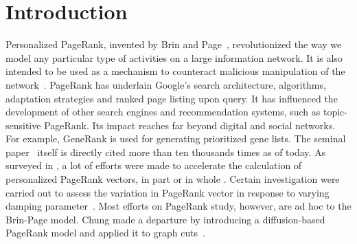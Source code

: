 \documentclass[conference]{IEEEtran}
\begin{document}




\section{Introduction}
\label{sec:intro}
% 


Personalized PageRank, invented by Brin and Page~\cite{page1999pagerank,
  ilprints361}, revolutionized the way we model any particular type of
activities on a large information network. It is also intended to be
used as a mechanism to counteract malicious manipulation of the
network~\cite{page1999pagerank, ilprints361, sheldon2010manipulation}. 
PageRank has underlain Google's
search architecture, algorithms, adaptation strategies and ranked page
listing upon query.  It has influenced the development of other
search engines and recommendation systems, such as topic-sensitive
PageRank\cite{haveliwala2003topic}. Its impact reaches far beyond
digital and social networks. For example, GeneRank is used for
generating prioritized gene
lists\cite{morrison2005generank,wu2010krylov}. The seminal
paper~\cite{page1999pagerank} itself is directly cited more than ten
thousands times as of today.  As surveyed in
\cite{langville2004deeper,berkhin2005survey}, a lot of efforts were made
to accelerate the calculation of personalized PageRank vectors, in part
or in whole \cite{ilprints596,ilprints579}. Certain investigation were
carried out to assess the variation in PageRank vector in response to
varying damping
parameter~\cite{boldi2005pagerank,bressan2010choose}. Most efforts on
PageRank study, however, are ad hoc to the Brin-Page model. Chung made
a departure by introducing a diffusion-based PageRank model and applied
it to graph cuts~\cite{chung2007heat,chung2009local}.
\end{document}

